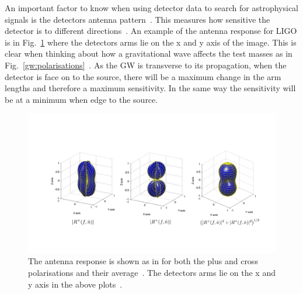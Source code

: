 An important factor to know when using detector data to search for
astrophysical signals is the detectors antenna pattern~. This measures how sensitive the
detector is to different directions~. An example of
the antenna response for \gls{LIGO} is in Fig.~\ref{intro:detectors:response}
where the detectors arms lie on the x and y axis of the image.  This is clear
when thinking about how a gravitational wave affects the test masses as in
Fig.~\ref{gw:polarisations}~.  As the \gls{GW} is transverse to its propagation,
when the detector is face on to the source, there will be a maximum change in
the arm lengths and therefore a maximum sensitivity.  In the same way the
sensitivity will be at a minimum when edge to the source.~

\begin{figure}
    \centering
    \includegraphics[width=\textwidth]{C1_intro/LIGO_beam_patterns.png}
    \caption[Antenna response of the \gls{LIGO} detectors.]{The antenna
response is shown as in \citep{romano2019SearchesStochastic} for both the plus
and cross~ polarisations and their average~. The detectors arms lie on the x and
y axis in the above plots~. } \label{intro:detectors:response}
\end{figure}

